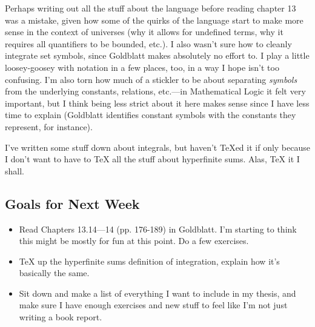 \documentclass{article}
\begin{document}
Perhaps writing out all the stuff about the language before reading chapter 13 was a mistake, given how some of the quirks of the language start to make more sense in the context of universes (why it allows for undefined terms, why it requires all quantifiers to be bounded, etc.). I also wasn't sure how to cleanly integrate set symbols, since Goldblatt makes absolutely no effort to. I play a little loosey-goosey with notation in a few places, too, in a way I hope isn't too confusing. I'm also torn how much of a stickler to be about separating \textit{symbols} from the underlying constants, relations, etc.---in Mathematical Logic it felt very important, but I think being less strict about it here makes sense since I have less time to explain (Goldblatt identifies constant symbols with the constants they represent, for instance).

I've written some stuff down about integrals, but haven't TeXed it if only because I don't want to have to TeX all the stuff about hyperfinite sums. Alas, TeX it I shall.

\subsection{Goals for Next Week}
\begin{itemize}
    \item Read Chapters 13.14---14 (pp. 176-189) in Goldblatt. I'm starting to think this might be mostly for fun at this point. Do a few exercises.
    \item TeX up the hyperfinite sums definition of integration, explain how it's basically the same.
    \item Sit down and make a list of everything I want to include in my thesis, and make sure I have enough exercises and new stuff to feel like I'm not just writing a book report.
\end{itemize}

\nocite{goldblatt1998}
\printbibliography[title={Things I'm Looking At}]
\end{document}

